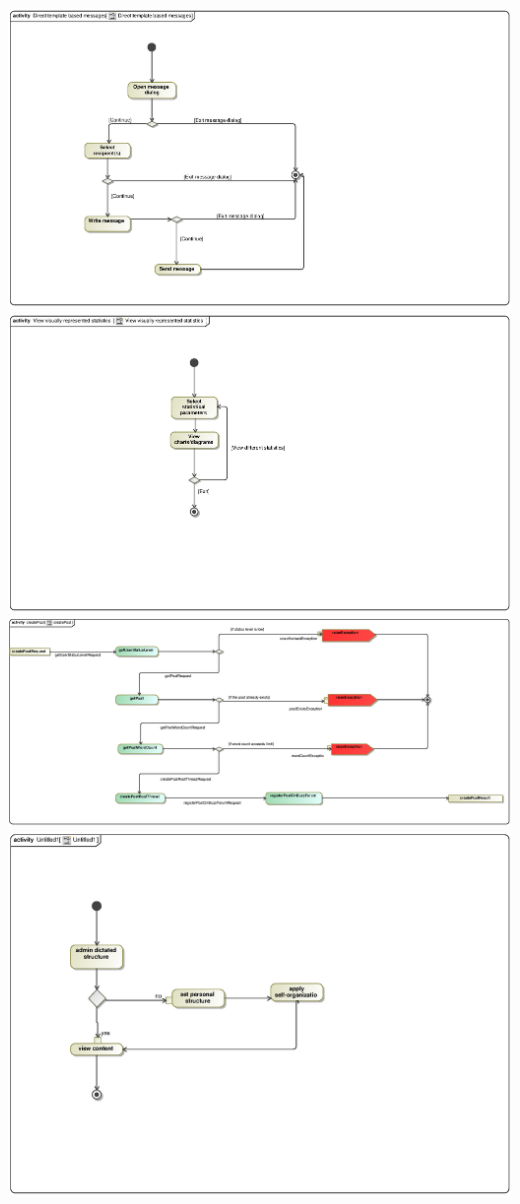 \documentclass{scrreprt}
\begin{document}
\includegraphics[scale=.9]{seanAC.eps}\\
\includegraphics[scale=.9]{seanAC1.eps}\\
\includegraphics[scale=.9]{Shaun_activity.eps}\\
\includegraphics[scale=.9]{Semaka_Activity_Diagram.eps}\\
\end{document}
